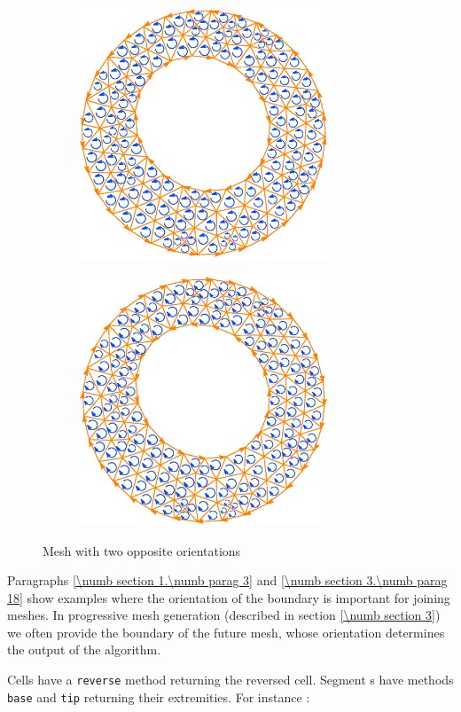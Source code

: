 \begin{figure}[ht] \centering
\begin{subfigure}{76mm}\centering
  \includegraphics[width=75mm]{oriented-annulus-1}
\end{subfigure}  
\begin{subfigure}{76mm}\centering
  \includegraphics[width=75mm]{oriented-annulus-2}
\end{subfigure}  
  \caption{Mesh with two opposite orientations}
  \label{\numb section 1.\numb fig 4}
\end{figure}

Paragraphs \ref{\numb section 1.\numb parag 3} and \ref{\numb section 3.\numb parag 18}
show examples where the orientation of the boundary is important for joining meshes.
In progressive mesh generation (described in section \ref{\numb section 3}) we often
provide the boundary of the future mesh, whose orientation determines the output of the
algorithm.

Cells have a {\small\tt reverse} method returning the reversed cell.
Segment {\small\tt {}}s have methods {\small\tt base} and {\small\tt tip} returning their extremities.
For instance :

